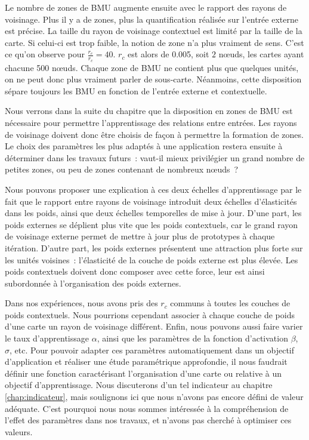 \documentclass[../main]{subfiles}
\begin{document}
Le nombre de zones de BMU augmente ensuite avec le rapport des rayons de voisinage. Plus il y a de zones, plus la quantification réalisée sur l'entrée externe est précise.
La taille du rayon de voisinage contextuel est  limité par la taille de la carte. Si celui-ci est trop faible, la notion de zone n'a plus vraiment de sens. C'est ce qu'on observe pour $\frac{r_e}{r_c} = 40$. $r_c$ est alors de 0.005, soit $2$ n\oe{}uds, les cartes ayant chacune 500 n\oe{}uds. 
Chaque zone de BMU ne contient plus que quelques unités, on ne peut donc plus vraiment parler de sous-carte. Néanmoins, cette disposition sépare toujours les BMU en fonction de l'entrée externe et contextuelle.

Nous verrons dans la suite du chapitre que la disposition en zones de BMU est nécessaire pour permettre l'apprentissage des relations entre entrées. Les rayons de voisinage doivent donc être choisis de façon à permettre la formation de zones. Le choix des paramètres les plus adaptés à une application restera ensuite à déterminer dans les travaux futurs~: vaut-il mieux privilégier un grand nombre de petites zones, ou peu de zones contenant de nombreux n\oe{}uds~?

Nous pouvons proposer une explication à ces deux échelles d'apprentissage par le fait que le rapport entre rayons de voisinage introduit deux échelles d'élasticités dans les poids, ainsi que deux échelles temporelles de mise à jour.
D'une part, les poids externes se déplient plus vite que les poids contextuels, car le grand rayon de voisinage externe permet de mettre à jour plus de prototypes à chaque itération.
D'autre part, les poids externes présentent une \og attraction \fg{} plus forte sur les unités voisines~: l'élasticité de la couche de poids externe est plus élevée.
Les poids contextuels doivent donc composer avec cette force, leur est ainsi subordonnée à l'organisation des poids externes. 


Dans nos expériences, nous avons pris des $r_c$ communs à toutes les couches de poids contextuels.
Nous pourrions cependant associer à chaque couche de poids d'une carte un rayon de voisinage différent. 
Enfin, nous pouvons aussi faire varier le taux d'apprentissage $\alpha$, ainsi que les paramètres de la fonction d'activation $\beta$, $\sigma$, etc.
Pour pouvoir adapter ces paramètres automatiquement dans un objectif d'application et réaliser une étude paramétrique approfondie, il nous faudrait définir une fonction caractérisant l'organisation d'une carte ou relative à un objectif d'apprentissage. 
Nous discuterons d'un tel indicateur au chapitre \ref{chap:indicateur}, mais soulignons ici que nous n'avons pas encore défini de valeur adéquate. C'est pourquoi nous nous sommes intéressée à la compréhension de l'effet des paramètres dans nos travaux, et n'avons pas cherché à optimiser ces valeurs.
\end{document}
